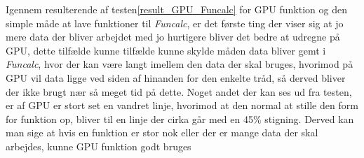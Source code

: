 Igennem resulterende af testen\ref{result_GPU_Funcalc} for GPU funktion og den simple måde at lave funktioner til \textit{Funcalc}, er det første ting der viser sig at jo mere data der bliver arbejdet med jo hurtigere bliver det bedre at udregne på GPU, dette tilfælde kunne tilfælde kunne skylde måden data bliver gemt i \textit{Funcalc}, hvor der kan være langt imellem den data der skal bruges, hvorimod på GPU vil data ligge ved siden af hinanden for den enkelte tråd, så derved bliver der ikke brugt nær så meget tid på dette. Noget andet der kan ses ud fra testen, er af GPU er stort set en vandret linje, hvorimod at den normal at stille den form for funktion op, bliver til en linje der cirka går med en 45\% stigning.
Derved kan man sige at hvis en funktion er stor nok eller der er mange data der skal arbejdes, kunne GPU funktion godt bruges